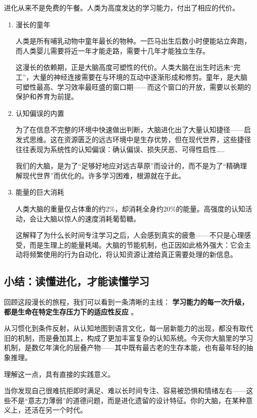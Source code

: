 \documentclass[11pt]{article}
\begin{document}
进化从来不是免费的午餐。人类为高度发达的学习能力，付出了相应的代价。
\begin{enumerate}
\item 漫长的童年
\label{sec:org9b87b08}

人类是所有哺乳动物中童年最长的物种。一匹马出生后数小时便能站立奔跑，而人类婴儿需要将近一年才能走路，需要十几年才能独立生存。

这漫长的依赖期，正是大脑高度可塑性的代价。人类大脑在出生时远未“完工”，大量的神经连接需要在与环境的互动中逐渐形成和修剪。童年，是大脑可塑性最高、学习效率最旺盛的窗口期——而这个窗口的开放，需要以长期的保护和养育为前提。
\item 认知偏误的内置
\label{sec:orgc2c1bb4}

为了在信息不完整的环境中快速做出判断，大脑进化出了大量认知捷径——启发式思维。这在资源匮乏的远古环境中是生存优势，但在现代世界，这些捷径往往表现为系统性的认知偏误：确认偏误、损失厌恶、可得性启性\ldots{}..

我们的大脑，是为了“足够好地应对远古草原”而设计的，而不是为了“精确理解现代世界”而优化的。许多学习困难，根源就在于此。
\item 能量的巨大消耗
\label{sec:org0f5e75f}

人类大脑的重量仅占体重的约2\%，却消耗全身约20\%的能量。高强度的认知活动，会让大脑以惊人的速度消耗葡萄糖。

这解释了为什么长时间专注学习之后，人会感到真实的疲惫——不只是心理感受，而是生理上的能量耗竭。大脑的节能机制，也正因如此格外强大：它会主动将频繁使用的行为自动化，将认知资源让渡给真正需要处理的新信息。
\end{enumerate}
\subsection{小结：读懂进化，才能读懂学习}
\label{sec:orgfeed96e}

回顾这段漫长的旅程，我们可以看到一条清晰的主线： \textbf{学习能力的每一次升级，都是生命在特定生存压力下的适应性反应} 。

从习惯化到条件反射，从认知地图到语言文化，每一层新能力的出现，都没有取代旧的机制，而是叠加其上，构成了更加丰富复杂的认知系统。今天你大脑里的学习机制，是数亿年演化的层叠产物——其中既有最古老的生存本能，也有最年轻的抽象推理。

理解这一点，具有直接的实践意义。

当你发现自己很难抗拒即时满足、难以长时间专注、容易被恐惧和情绪左右——这些不是“意志力薄弱”的道德问题，而是进化遗留的设计特征。你的大脑，在某种意义上，还活在另一个时代。
\end{document}
